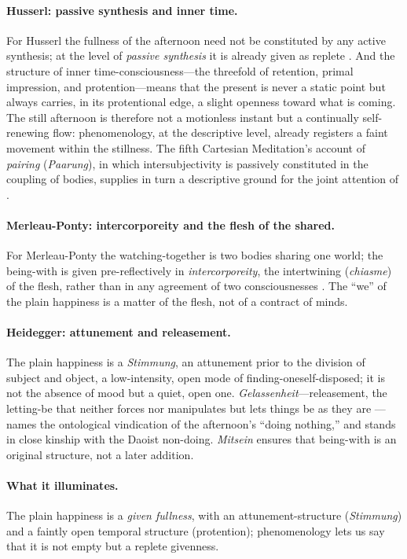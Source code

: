 \paragraph{Husserl: passive synthesis and inner time.} For Husserl the fullness of the afternoon need not be constituted by any active synthesis; at the level of \emph{passive synthesis} it is already given as replete \parencite{husserl2001}. And the structure of inner time-consciousness---the threefold of retention, primal impression, and protention---means that the present is never a static point but always carries, in its protentional edge, a slight openness toward what is coming. The still afternoon is therefore not a motionless instant but a continually self-renewing flow: phenomenology, at the descriptive level, already registers a faint movement within the stillness. The fifth Cartesian Meditation's account of \emph{pairing} (\emph{Paarung}), in which intersubjectivity is passively constituted in the coupling of bodies, supplies in turn a descriptive ground for the joint attention of .

\paragraph{Merleau-Ponty: intercorporeity and the flesh of the shared.} For Merleau-Ponty the watching-together is two bodies sharing one world; the being-with is given pre-reflectively in \emph{intercorporeity}, the intertwining (\emph{chiasme}) of the flesh, rather than in any agreement of two consciousnesses \parencite{merleau-ponty1962}. The ``we'' of the plain happiness is a matter of the flesh, not of a contract of minds.

\paragraph{Heidegger: attunement and releasement.} The plain happiness is a \emph{Stimmung}, an attunement prior to the division of subject and object, a low-intensity, open mode of finding-oneself-disposed; it is not the absence of mood but a quiet, open one. \emph{Gelassenheit}---releasement, the letting-be that neither forces nor manipulates but lets things be as they are \parencite{heidegger1966}---names the ontological vindication of the afternoon's ``doing nothing,'' and stands in close kinship with the Daoist non-doing. \emph{Mitsein} ensures that being-with is an original structure, not a later addition.

\paragraph{What it illuminates.} The plain happiness is a \emph{given fullness}, with an attunement-structure (\emph{Stimmung}) and a faintly open temporal structure (protention); phenomenology lets us say that it is not empty but a replete givenness.

